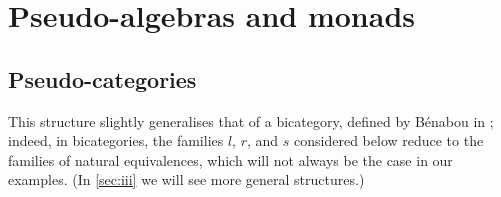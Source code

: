 \documentclass[fleqn]{article}
\newcommand{\oldpage}[1]{\marginpar{\footnotesize$\Big\vert$ \textit{p.~#1}}}
\begin{document}
\section{Pseudo-algebras and monads}
\label{sec:ii}

\subsection{Pseudo-categories}
\label{sec:ii.1}
\oldpage{243}

This structure slightly generalises that of a bicategory, defined by Bénabou in \cite{Be};
indeed, in bicategories, the families $l$, $r$, and $s$ considered below reduce to the families of natural equivalences, which will not always be the case in our examples.
(In \cref{sec:iii} we will see more general structures.)
\end{document}
